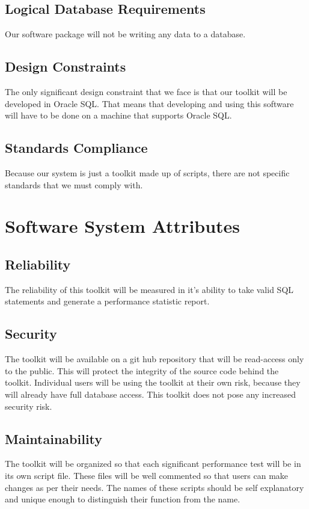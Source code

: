 \documentclass[draftclsnofoot, onecolumn, compsoc, 10pt]{IEEEtran}
\begin{document}
\subsection{Logical Database Requirements}
Our software package will not be writing any data to a database.

\subsection{Design Constraints}
The only significant design constraint that we face is that our toolkit will be developed in Oracle SQL. 
That means that developing and using this software will have to be done on a machine that supports Oracle SQL.

\subsection{Standards Compliance}
Because our system is just a toolkit made up of scripts, there are not specific standards that we must comply with. 

\section{Software System Attributes}

\subsection{Reliability}
The reliability of this toolkit will be measured in it's ability to take valid SQL statements and generate a performance statistic report. 

\subsection{Security}
The toolkit will be available on a git hub repository that will be read-access only to the public. 
This will protect the integrity of the source code behind the toolkit. 
Individual users will be using the toolkit at their own risk, because they will already have full database access.
This toolkit does not pose any increased security risk. 

\subsection{Maintainability}
The toolkit will be organized so that each significant performance test will be in its own script file. 
These files will be well commented so that users can make changes as per their needs. 
The names of these scripts should be self explanatory and unique enough to distinguish their function from the name. 
\end{document}
